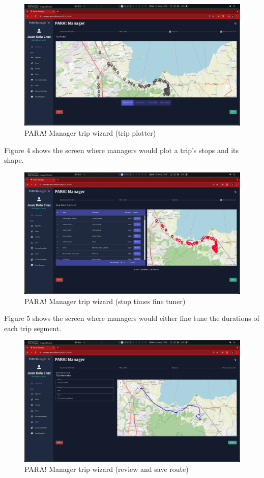 \documentclass[journal]{./IEEE/IEEEtran}
\begin{document}
\begin{description}
\begin{figure}[!h]
    \centering
        \includegraphics[scale=0.115]{./figures/manager/trip wizard 2.jpeg}
    \caption{PARA! Manager trip wizard (trip plotter)}
\end{figure}

Figure 4 shows the screen where managers would plot a trip's stops and its shape.

\begin{figure}[!h]
    \centering
        \includegraphics[scale=0.115]{./figures/manager/trip wizard 3.jpeg}
    \caption{PARA! Manager trip wizard (stop times fine tuner)}
\end{figure}

Figure 5 shows the screen where managers would either fine tune the durations of each trip segment. 

\begin{figure}[!h]
    \centering
        \includegraphics[scale=0.115]{./figures/manager/trip wizard 4.jpeg}
    \caption{PARA! Manager trip wizard (review and save route)}
\end{figure}


\end{description}
\end{document}
